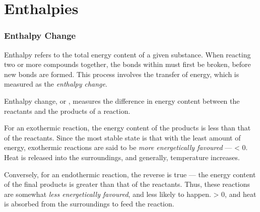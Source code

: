
\pagebreak
\part{Enthalpies}

\section{Enthalpy Change}

	Enthalpy refers to the total energy content of a given substance. When reacting two or more compounds together, the bonds within
	must first be broken, before new bonds are formed. This process involves the transfer of energy, which is measured as the
	\textit{enthalpy change}.

	Enthalpy change, or \enth{}, measures the difference in energy content between the reactants and the products of a reaction.

	For an exothermic reaction, the energy content of the products is less than that of the reactants. Since the most stable state
	is that with the least amount of energy, exothermic reactions are said to be \textit{more energetically favoured} –– \enth{} < 0.
	Heat is released into the surroundings, and generally, temperature increases.


	\pagebreak
	Conversely, for an endothermic reaction, the reverse is true –– the energy content of the final products is greater than that
	of the reactants. Thus, these reactions are somewhat \textit{less energetically favoured}, and less likely to happen.
	\enth{} > 0, and heat is absorbed from the surroundings to feed the reaction.


